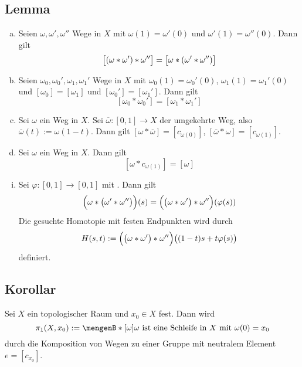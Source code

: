 \subsection{Lemma} %
\label{sub:98}
\begin{enumerate}[a)]
	\item Seien $\omega, \omega', \omega''$ Wege in $X$ mit $\omega(1)= \omega'(0)$ und $\omega'(1)= \omega''(0)$. Dann gilt 
	\[
		\benbrace[\big]{(\omega * \omega') * \omega''} =  \benbrace[\big]{\omega * ( \omega' * \omega'')}
	\]
	\item Seien $\omega_0, \omega_0', \omega_1, \omega_1'$ Wege in $X$ mit $\omega_0(1)= \omega_0'(0)$, $\omega_1(1)= \omega_1'(0)$ und 
	$[\omega_0] = [\omega_1]$ und $[\omega_0'] = [\omega_1']$. Dann gilt
	\[
		[\omega_0 * \omega_0'] = [\omega_1 * \omega_1']
	\]
	\item Sei $\omega$ ein Weg in $X$. Sei $\overline{\omega} : [0,1] \to X $ der umgekehrte Weg, also $\overline{\omega} (t) := \omega(1-t)$. Dann gilt 
	$[\omega * \overline{\omega}] = [c_{\omega(0)}]$, $[\overline{\omega} * \omega ] = [c_{\omega(1)}]$.
	\item Sei $\omega$ ein Weg in $X$. Dann gilt 
	\[
		[\omega * c_{\omega(1)}] = [\omega]
	\]
\end{enumerate}
\begin{enumerate}[(i)]
	\item Sei $\varphi : [0,1] \to [0,1]$ mit .
	Dann gilt 
	\begin{align*}
		\enbrace[\Big]{\omega * \enbrace[\big]{\omega' * \omega''} }(s) = \enbrace[\Big]{\enbrace[\big]{\omega * \omega'} * \omega''} (\varphi(s))  
	\end{align*}
	Die gesuchte Homotopie mit festen Endpunkten wird durch
	\[
		H(s,t) := \enbrace[\Big]{ \enbrace[\big]{\omega * \omega'} * \omega'' } \enbrace[\big]{(1-t)s + t \varphi(s)}  
	\]
	definiert. \bewende
\end{enumerate}

\subsection{Korollar} %
\label{sub:99}
Sei $X$ ein topologischer Raum und $x_0 \in X$ fest. Dann wird 
\[
	\pi_1 (X, x_0) := \set[{[\omega]}]{\omega \text{ ist eine Schleife in }X \text{ mit } \omega(0)= x_0} 
\]
durch die Komposition von Wegen zu einer Gruppe mit neutralem Element $e= [c_{x_0}]$.

